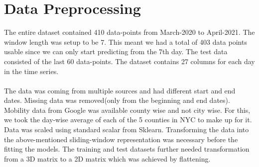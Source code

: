 \documentclass[12pt,a4paper]{article}
\begin{document}
\section*{Data Preprocessing}
The entire dataset contained 410 data-points from March-2020 to April-2021. The window 
length was setup to be 7. This meant we had a total of 403 data points usable since we can 
only start predicting from the 7th day. The test data consisted of the last 60 data-points.
The dataset contains 27 columns for each day in the time series.
\\\\
The data was coming from multiple sources and had different
start and end dates. Missing data was removed(only from the beginning and end dates). Mobility data from Google was available county wise and not city wise. For this,
we took the day-wise average of each of the 5 counties in NYC to make up for it. Data was scaled
using standard scalar from Sklearn. Transforming the data into the above-mentioned sliding-window
representation was necessary before the fitting the models.
The training and test datasets further needed transformation from a 3D matrix to a 2D matrix
which was achieved by flattening.
\end{document}
